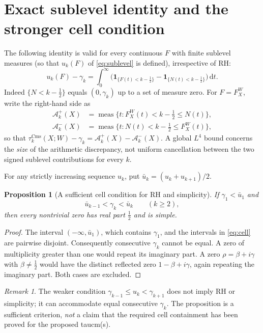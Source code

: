 \documentclass[11pt,a4paper]{article}
\numberwithin{equation}{section}
\newtheorem{proposition}[theorem]{Proposition}
\theoremstyle{definition}
\theoremstyle{remark}
\newtheorem{remark}[theorem]{Remark}
\newcommand{\meas}{\operatorname{meas}}
\newcommand{\ind}{\mathbf 1}
\newcommand{\Cms}{\mathrm{Cms}}
\newcommand{\dd}{\,\mathrm dt}
\begin{document}
\section{Exact sublevel identity and the stronger cell condition}\label{sec:cells}
The following identity is valid for every continuous $F$ with finite sublevel measures (so that $u_k(F)$ of \eqref{eq:sublevel} is defined), irrespective of RH:
\begin{equation}\label{eq:area}
u_k(F)-\gamma_k
=\int_0^\infty\bigl(\ind_{\{F(t)<k-\frac12\}}-
\ind_{\{N(t)<k-\frac12\}}\bigr)\dd.
\end{equation}
Indeed $\{N<k-\frac12\}$ equals $(0,\gamma_k)$ up to a set of measure zero. For $F=F_X^W$, write the right-hand side as
\begin{align}
\mathcal A_k^+(X)&=\meas\{t:F_X^W(t)<k-\tfrac12\le N(t)\},\label{eq:Aplus}\\
\mathcal A_k^-(X)&=\meas\{t:N(t)<k-\tfrac12\le F_X^W(t)\},\label{eq:Aminus}
\end{align}
so that $\tau_k^{\Cms}(X;W)-\gamma_k=\mathcal A_k^+(X)-\mathcal A_k^-(X)$.
A global $L^4$ bound concerns the \emph{size} of the arithmetic discrepancy, not uniform cancellation between the two signed sublevel contributions for every $k$.

For any strictly increasing sequence $u_k$, put $\bar u_k=(u_k+u_{k+1})/2$.
\begin{proposition}[A sufficient cell condition for RH and simplicity]\label{prop:RH}
If $\gamma_1<\bar u_1$ and
\begin{equation}\label{eq:cell}
\bar u_{k-1}<\gamma_k<\bar u_k
\qquad(k\ge2),
\end{equation}
then every nontrivial zero has real part $\frac12$ and is simple.
\end{proposition}
\begin{proof}
The interval $(-\infty,\bar u_1)$, which contains $\gamma_1$, and the intervals in \eqref{eq:cell} are pairwise disjoint. Consequently consecutive $\gamma_k$ cannot be equal. A zero of multiplicity greater than one would repeat its imaginary part. A zero $\rho=\beta+i\gamma$ with $\beta\ne\frac12$ would have the distinct reflected zero $1-\beta+i\gamma$, again repeating the imaginary part. Both cases are excluded.
\end{proof}
\begin{remark}
The weaker condition $\gamma_{k-1}\le u_k<\gamma_{k+1}$ does not imply RH or simplicity; it can accommodate equal consecutive $\gamma_k$. The proposition is a sufficient criterion, \emph{not} a claim that the required cell containment has been proved for the proposed taucm(s).
\end{remark}
\end{document}
